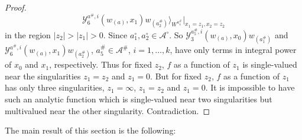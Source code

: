 \documentclass{amsproc}
\theoremstyle{definition}
\theoremstyle{remark}
\numberwithin{equation}{section}
\begin{document}
\begin{proof}
$$\mathcal{Y}_{6}^{a^{\#},i}(w_{(a)}, x_{1})
w_{(a^{\#}_{2})}\rangle_{W^{a^{\#}_{4}}}|_{x_{1}=z_{1},
x_{2}=z_{2}}$$
in the region $|z_{2}|>|z_{1}|>0$. 
Since $a^{\circ}_{1}, a^{\circ}_{2}\in \mathcal{A}^{\circ}$. So
$\mathcal{Y}^{a^{\#}_{5}, i}_{3}(w_{(a)},
x_{0})w_{(a^{\#}_{1})}$ and 
$\mathcal{Y}_{6}^{a^{\#},i}(w_{(a)}, x_{1})
w_{(a^{\#}_{2})}$, $a^{\#}_{5}\in \mathcal{A}^{\#}$,
$i=1, \dots, k$,
have only terms in integral power of $x_{0}$ and $x_{1}$, respectively.
Thus for fixed $z_{2}$, $f$ 
as a function of $z_{1}$ is single-valued near the singularities
$z_{1}=z_{2}$ and $z_{1}=0$. But for fixed $z_{2}$, $f$ 
as a function of $z_{1}$ has only three singularities, $z_{1}=\infty$,
$z_{1}=z_{2}$ and $z_{1}=0$. It is impossible to have such 
an analytic function
which is single-valued near two singularities but multivalued near 
the other singularity. Contradiction. 
\end{proof}




The main result of this section is the following:
\end{document}

